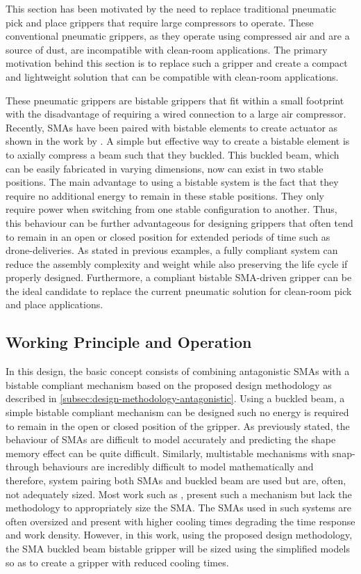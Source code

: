 This section has been motivated by the need to replace traditional pneumatic pick and place grippers that require large compressors to operate. These conventional pneumatic grippers, as they operate using compressed air and are a source of dust, are incompatible with clean-room applications. The primary motivation behind this section is to replace such a gripper and create a compact and lightweight solution that can be compatible with clean-room applications.

These pneumatic grippers are bistable grippers that fit within a small footprint with the disadvantage of requiring a wired connection to a large air compressor. Recently, SMAs have been paired with bistable elements to create actuator as shown in the work by \todocite. A simple but effective way to create a bistable element is to axially compress a beam such that they buckled. This buckled beam, which can be easily fabricated in varying dimensions, now can exist in two stable positions. The main advantage to using a bistable system is the fact that they require no additional energy to remain in these stable positions. They only require power when switching from one stable configuration to another. Thus, this behaviour can be further advantageous for designing grippers that often tend to remain in an open or closed position for extended periods of time such as drone-deliveries. As stated in previous examples, a fully compliant system can reduce the assembly complexity and weight while also preserving the life cycle if properly designed. Furthermore, a compliant bistable SMA-driven gripper can be the ideal candidate to replace the current pneumatic solution for clean-room pick and place applications.
\subsection{Working Principle and Operation}
In this design, the basic concept consists of combining antagonistic SMAs with a bistable compliant mechanism based on the proposed design methodology as described in \cref{subsec:design-methodology-antagonistic}. Using a buckled beam, a simple bistable compliant mechanism can be designed such no energy is required to remain in the open or closed position of the gripper. As previously stated, the behaviour of SMAs are difficult to model accurately and predicting the shape memory effect can be quite difficult. Similarly, multistable mechanisms with snap-through behaviours are incredibly difficult to model mathematically and therefore, system pairing both SMAs and buckled beam are used but are, often, not adequately sized. Most work such as \todocite, present such a mechanism but lack the methodology to appropriately size the SMA. The SMAs used in such systems are often oversized and present with higher cooling times degrading the time response and work density. However, in this work, using the proposed design methodology, the SMA buckled beam bistable gripper will be sized using the simplified models so as to create a gripper with reduced cooling times.

